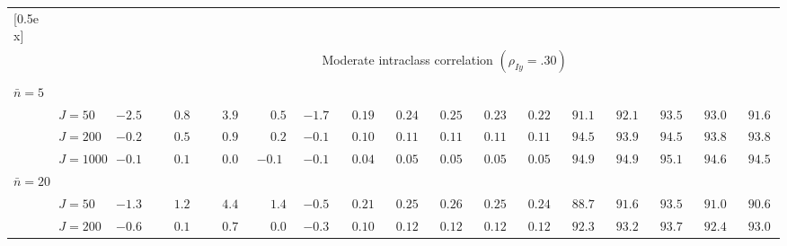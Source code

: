 \begin{sidewaystable}
\begin{threeparttable}
\begin{tabular}{llccccccccccccccc}
[0.5ex]\hline\\[-1.6ex] 
& & \multicolumn{15}{c}{Moderate intraclass correlation $(\rho_{Iy}=.30)$} \\[0.6ex]\hline\\[-1.8ex]
\multicolumn{4}{l}{$\bar{n}=5$} \\  & \nopagebreak $\;J=50$  & ${-}2.5\phantom{0}$ & $\phantom{-}0.8\phantom{0}$ & $\phantom{-}3.9\phantom{0}$ & $\phantom{-}0.5\phantom{0}$ & ${-}1.7\phantom{0}$ & $\phantom{0}0.19\phantom{0}$ & $\phantom{0}0.24\phantom{0}$ & $\phantom{0}0.25\phantom{0}$ & $\phantom{0}0.23\phantom{0}$ & $\phantom{0}0.22\phantom{0}$ & $\phantom{0}91.1\phantom{0}$ & $\phantom{0}92.1\phantom{0}$ & $\phantom{0}93.5\phantom{0}$ & $\phantom{0}93.0\phantom{0}$ & $\phantom{0}91.6\phantom{0}$ \\
 & \nopagebreak $\;J=200$  & ${-}0.2\phantom{0}$ & $\phantom{-}0.5\phantom{0}$ & $\phantom{-}0.9\phantom{0}$ & $\phantom{-}0.2\phantom{0}$ & ${-}0.1\phantom{0}$ & $\phantom{0}0.10\phantom{0}$ & $\phantom{0}0.11\phantom{0}$ & $\phantom{0}0.11\phantom{0}$ & $\phantom{0}0.11\phantom{0}$ & $\phantom{0}0.11\phantom{0}$ & $\phantom{0}94.5\phantom{0}$ & $\phantom{0}93.9\phantom{0}$ & $\phantom{0}94.5\phantom{0}$ & $\phantom{0}93.8\phantom{0}$ & $\phantom{0}93.8\phantom{0}$ \\
 & \nopagebreak $\;J=1000$  & ${-}0.1\phantom{0}$ & $\phantom{-}0.1\phantom{0}$ & $\phantom{-}0.0\phantom{0}$ & ${-}0.1\phantom{0}$ & ${-}0.1\phantom{0}$ & $\phantom{0}0.04\phantom{0}$ & $\phantom{0}0.05\phantom{0}$ & $\phantom{0}0.05\phantom{0}$ & $\phantom{0}0.05\phantom{0}$ & $\phantom{0}0.05\phantom{0}$ & $\phantom{0}94.9\phantom{0}$ & $\phantom{0}94.9\phantom{0}$ & $\phantom{0}95.1\phantom{0}$ & $\phantom{0}94.6\phantom{0}$ & $\phantom{0}94.5\phantom{0}$ \\
\multicolumn{4}{l}{$\bar{n}=20$} \\  & \nopagebreak $\;J=50$  & ${-}1.3\phantom{0}$ & $\phantom{-}1.2\phantom{0}$ & $\phantom{-}4.4\phantom{0}$ & $\phantom{-}1.4\phantom{0}$ & ${-}0.5\phantom{0}$ & $\phantom{0}0.21\phantom{0}$ & $\phantom{0}0.25\phantom{0}$ & $\phantom{0}0.26\phantom{0}$ & $\phantom{0}0.25\phantom{0}$ & $\phantom{0}0.24\phantom{0}$ & $\phantom{0}88.7\phantom{0}$ & $\phantom{0}91.6\phantom{0}$ & $\phantom{0}93.5\phantom{0}$ & $\phantom{0}91.0\phantom{0}$ & $\phantom{0}90.6\phantom{0}$ \\
 & \nopagebreak $\;J=200$  & ${-}0.6\phantom{0}$ & $\phantom{-}0.1\phantom{0}$ & $\phantom{-}0.7\phantom{0}$ & $\phantom{-}0.0\phantom{0}$ & ${-}0.3\phantom{0}$ & $\phantom{0}0.10\phantom{0}$ & $\phantom{0}0.12\phantom{0}$ & $\phantom{0}0.12\phantom{0}$ & $\phantom{0}0.12\phantom{0}$ & $\phantom{0}0.12\phantom{0}$ & $\phantom{0}92.3\phantom{0}$ & $\phantom{0}93.2\phantom{0}$ & $\phantom{0}93.7\phantom{0}$ & $\phantom{0}92.4\phantom{0}$ & $\phantom{0}93.0\phantom{0}$ \\

\end{tabular}
\end{threeparttable}
\end{sidewaystable}
